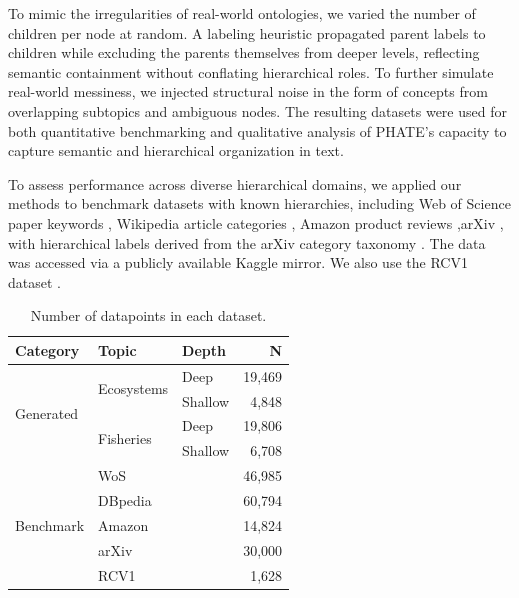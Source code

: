 To mimic the irregularities of real-world ontologies, we varied the number of children per node at random. A labeling heuristic propagated parent labels to children while excluding the parents themselves from deeper levels, reflecting semantic containment without conflating hierarchical roles. To further simulate real-world messiness, we injected structural noise in the form of concepts from overlapping subtopics and ambiguous nodes. 
The resulting datasets were used for both quantitative benchmarking and qualitative analysis of PHATE’s capacity to capture semantic and hierarchical organization in text.

To assess performance across diverse hierarchical domains, we applied our methods to benchmark datasets with known hierarchies, including Web of Science paper keywords \cite{kowsari2017HDLTex}, Wikipedia article categories \cite{brummer2016dbpedia, NIPS2015_250cf8b5, yang2019xlnet}, Amazon product reviews \cite{yury_kashnitsky_2020},arXiv \cite{arxiv_data}, with hierarchical labels derived from the arXiv category taxonomy \cite{arxiv_taxonomy}. The data was accessed via a publicly available Kaggle mirror. We also use the RCV1 dataset \cite{lewis2004rcv1}.

\begin{table}[ht]
    \centering
    \caption{Number of datapoints in each dataset.}
    \begin{tabular}{l l l r}
    \hline
    \textbf{Category} & \textbf{Topic} & \textbf{Depth} & \textbf{N} \\
    \hline
    \multirow{4}{*}{Generated} 
     & \multirow{2}{*}{Ecosystems} & Deep & 19{,}469 \\
     &  & Shallow & 4{,}848 \\
     & \multirow{2}{*}{Fisheries} & Deep & 19{,}806 \\
     &  & Shallow & 6{,}708 \\
    \hline
    \multirow{5}{*}{Benchmark}
     & \multicolumn{2}{l}{WoS} & 46{,}985 \\
     & \multicolumn{2}{l}{DBpedia} & 60{,}794 \\
     & \multicolumn{2}{l}{Amazon} & 14{,}824 \\
     & \multicolumn{2}{l}{arXiv} & 30{,}000 \\
     & \multicolumn{2}{l}{RCV1} & 1{,}628 \\
    \hline
    \end{tabular}
    \label{tab:dataset_counts}
    \end{table}
